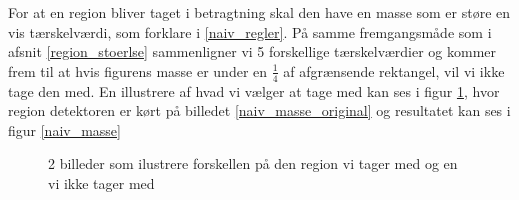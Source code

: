 For at en region bliver taget i betragtning skal den have en masse som
er støre en vis tærskelværdi, som forklare i \ref{naiv_regler}. På samme
fremgangsmåde som i afsnit \ref{region_stoerlse} sammenligner vi 5
forskellige tærskelværdier og kommer frem til at hvis figurens masse er
under en $\frac{1}{4}$ af afgrænsende rektangel, vil vi ikke tage den
med. En illustrere af hvad vi vælger at tage med kan ses i figur
\ref{masse}, hvor region detektoren er kørt på billedet
\ref{naiv_masse_original} og resultatet kan ses i figur \ref{naiv_masse}

\begin{figure}[!h]
    \centering
		\hspace{1em}
	    \hspace{1em}
		\label{masse}
		\caption{2 billeder som ilustrere forskellen på den region vi tager med og en vi ikke tager med}
\end{figure}
